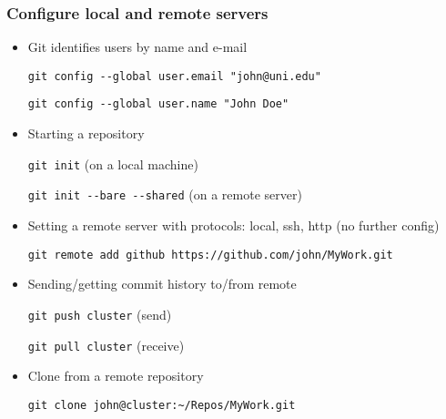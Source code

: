 \documentclass[xcolor=dvipsnames,10pt]{beamer}
\begin{document}
\begin{frame}
 \frametitle{Configure local and remote servers}
 
 \begin{itemize}
  \item<1> Git identifies users by name and e-mail
  
  \texttt{git config -{}-global user.email "john@uni.edu"}
  
  \texttt{git config -{}-global user.name "John Doe"}
  \vspace*{0.2cm}

  \item<2> Starting a repository
  
  \texttt{git init} (on a local machine)
  
  \texttt{git init -{}-bare -{}-shared} (on a remote server)
  \vspace*{0.2cm}
  
  \item<3,6> Setting a remote server with protocols: local, ssh, http (no further config)
  
  
  \begin{minipage}{1.1\textwidth}
  \end{minipage}

  \alert<6>{
\texttt{git remote add {\color{blue}github} https://github.com/john/MyWork.git}}
  \vspace*{0.2cm}
  
  \item<4> Sending/getting commit history to/from remote
  
  \texttt{git push {\color{blue}cluster}} (send)
  
  \texttt{git pull {\color{blue}cluster}} (receive)
  \vspace*{0.2cm}
  
  \item<5> Clone from a remote repository
  
  \texttt{git clone john@cluster:\textasciitilde/Repos/MyWork.git}
  
 \end{itemize}

\end{frame}
\end{document}
